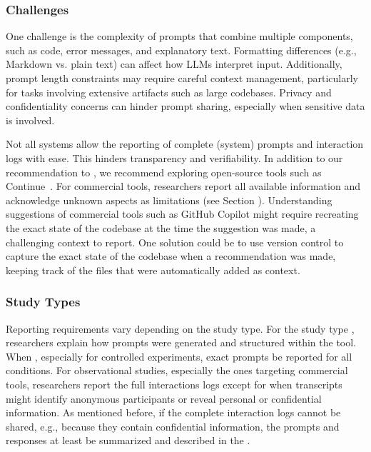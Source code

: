 \subsubsection{Challenges}

One challenge is the complexity of prompts that combine multiple components, such as code, error messages, and explanatory text.
Formatting differences (e.g., Markdown vs. plain text) can affect how LLMs interpret input.
Additionally, prompt length constraints may require careful context management, particularly for tasks involving extensive artifacts such as large codebases.
Privacy and confidentiality concerns can hinder prompt sharing, especially when sensitive data is involved.

Not all systems allow the reporting of complete (system) prompts and interaction logs with ease.
This hinders transparency and verifiability.
In addition to our recommendation to \openllm, we recommend exploring open-source tools such as Continue~\cite{continue.dev}.
For commercial tools, researchers \must report all available information and acknowledge unknown aspects as limitations (see Section \limitationsmitigations).
Understanding suggestions of commercial tools such as GitHub Copilot might require recreating the exact state of the codebase at the time the suggestion was made, a challenging context to report.
One solution could be to use version control to capture the exact state of the codebase when a recommendation was made, keeping track of the files that were automatically added as context.

\subsubsection{Study Types}

Reporting requirements vary depending on the study type.
For the study type \newtools, researchers \must explain how prompts were generated and structured within the tool.
When \llmusage, especially for controlled experiments, exact prompts \must be reported for all conditions.
For observational studies, especially the ones targeting commercial tools, researchers \must report the full interactions logs except for when transcripts might identify anonymous participants or reveal personal or confidential information.
As mentioned before, if the complete interaction logs cannot be shared, e.g., because they contain confidential information, the prompts and responses \must at least be summarized and described in the \paper.

